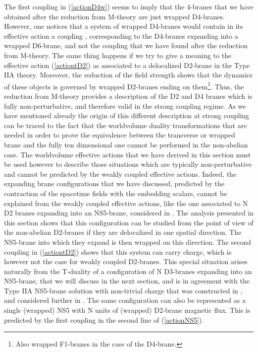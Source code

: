 \documentclass[12pt,a4paper]{article}
\begin{document}
The first coupling in (\ref{actionD4w}) seems to imply
that the 4-branes that we have obtained after the reduction
from M-theory are just wrapped D4-branes. However, one 
notices that a system of wrapped
D4-branes would contain in its effective action a coupling 
\coordHE{}, corresponding to the D4-branes expanding
into a wrapped D6-brane, and not the coupling \coordHE{}
that we have found after the reduction from M-theory.
The same thing happens if we try to give a meaning to the effective 
action (\ref{actiontD2})
as associated to a delocalized D2-brane in the Type 
IIA theory. Moreover, the reduction of the field strength \coordHE{}
shows that the dynamics of these objects is governed by wrapped D2-branes
ending on them\footnote{Also wrapped F1-branes in the case of the 
D4-brane.}. 
Thus, the reduction from M-theory provides a
description of the D2 and D4 branes  
which is fully non-perturbative, and therefore valid in the
strong coupling regime. As we have mentioned already
the origin of this different
description at strong coupling can be traced to the fact that 
the worldvolume duality transformations that are needed in order
to prove the equivalence between the transverse or wrapped brane
and the fully ten dimensional one cannot be performed in the
non-abelian case. 
The worldvolume effective actions that we have
derived in this section must be used however to describe those
situations which are typically non-perturbative and cannot be
predicted by the weakly coupled effective actions. Indeed, the expanding
brane configurations that we have discussed, predicted by the 
contraction of the spacetime fields with the embedding scalars, cannot
be explained from the weakly coupled effective actions,
like the one associated to N D2 branes expanding into an NS5-brane,
considered in \cite{Bena}. The analysis presented in this section 
shows that this configuration can be studied from the point of view of 
the non-abelian D2-branes if they are delocalized in one spatial
direction. The NS5-brane into which they expand is then wrapped on 
this direction. 
The second coupling in (\ref{actiontD2}) shows that this system 
can carry \coordHE{} charge, which is however not the case for weakly
coupled D2-branes. This special situation arises naturally from the
T-duality of a configuration of N D3-branes expanding into an NS5-brane,
that we will discuss in the next section, and is in agreement with
the Type IIA NS5-brane solution with non-trivial \coordHE{} charge
that was constructed in \cite{AOS}, and considered further in
\cite{Bena}. 
The same configuration can also be represented as a single (wrapped) 
NS5 with N units of (wrapped) D2-brane magnetic flux. 
This is predicted by the first coupling
in the second line of (\ref{actionNS5}).
\end{document}
